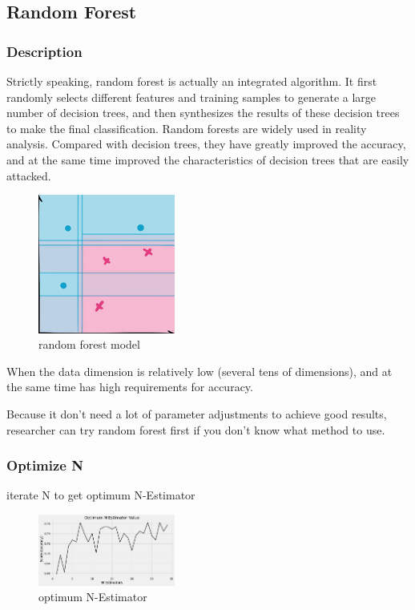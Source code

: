 \documentclass[11pt,en]{elegantpaper}
\begin{document}
\subsection{Random Forest}
\subsubsection{Description}
Strictly speaking, random forest is actually an integrated algorithm. It first randomly selects different features and training samples to generate a large number of decision trees, and then synthesizes the results of these decision trees to make the final classification. Random forests are widely used in reality analysis. Compared with decision trees, they have greatly improved the accuracy, and at the same time improved the characteristics of decision trees that are easily attacked.
\begin{figure}[H]
    \centering
    \includegraphics[width=0.4\textwidth]{figure/rf-model.jpg}
    \caption{random forest model}
\end{figure}

When the data dimension is relatively low (several tens of dimensions), and at the same time has high requirements for accuracy.

Because it don't need a lot of parameter adjustments to achieve good results, researcher can try random forest first if you don't know what method to use.


\subsubsection{Optimize N}
iterate N to get optimum N-Estimator

\begin{figure}[H]
    \centering
    \includegraphics[width=0.4\textwidth]{figure/rf-opti-n.png}
    \caption{optimum N-Estimator}
\end{figure}
\end{document}
